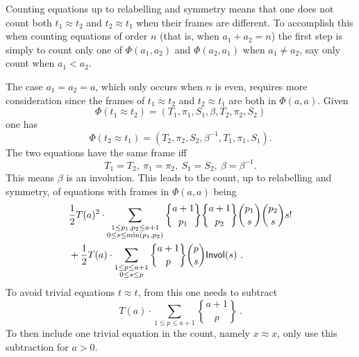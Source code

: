 \documentclass[12pt]{amsart}
\newcommand{\Invol}{{\sf Invol}}
\begin{document}
Counting equations up to relabelling and symmetry means that one does not count both 
$t_1 \approx t_2$ and $t_2 \approx t_1$ when their frames are different. To accomplish this
when counting equations of order $n$ (that is, when $a_1 + a_2 = n$) the first step is simply to count
only one of $\Phi(a_1,a_2)$ and $\Phi(a_2,a_1)$ when $a_1 \neq a_2$, say only count
 when $a_1<a_2$. 

The case $a_1=a_2 = a$, which only occurs when $n$ is even, requires more consideration since
the frames of $t_1 \approx t_2$ and $t_2 \approx t_1$ are both in $\Phi(a,a)$.
 Given $$\Phi(t_1 \approx t_2) = (T_1,\pi_1,S_1, \beta, T_2, \pi_2, S_2)$$ one has
 $$\Phi(t_2 \approx t_1) = (T_2, \pi_2, S_2, \beta^{-1}, T_1, \pi_1, S_1).$$
 The two equations have the same frame iff 
 $$T_1 = T_2,\  \pi_1 = \pi_2,\  S_1=S_2,\ \beta = \beta^{-1}.$$ 
 This means $\beta$ is an involution. This leads to the count,
 up to relabelling and symmetry, of
 equations with frames in $\Phi(a,a)$ being
 \begin{align*}
&\frac{1}{2} T(a)^2\cdot \sum_{\substack{1 \le p_1,p_2 \le a+1\\ 0\le s \le \min(p_1,p_2)}} 
{a+1 \brace p_1} {a+1 \brace p_2} {p_1 \choose s} {p_2 \choose s} s! \\
&+ \frac{1}{2} T(a) \cdot \sum_{\substack{1 \le p \le a+1\\ 0\le s \le p}} 
{a+1 \brace p}  {p \choose s}  \Invol(s) \ .
\end{align*}
To avoid trivial equations $t\approx t$, from this one needs to subtract
$$T(a)\cdot \sum_{1\le p \le a+1}  {a+1 \brace p} \ .$$
To then include one trivial equation in the count, namely $x\approx x$, only use this subtraction
for $a>0$.
\end{document}
